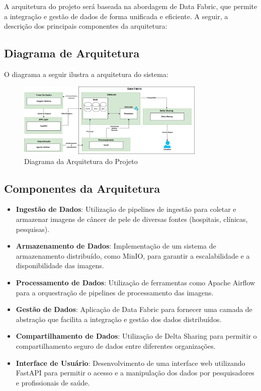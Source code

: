 A arquitetura do projeto será baseada na abordagem de Data Fabric, que permite a integração e gestão de dados de forma unificada e eficiente. A seguir, a descrição dos principais componentes da arquitetura:

\subsection{Diagrama de Arquitetura}
O diagrama a seguir ilustra a arquitetura do sistema:
\begin{figure}[h]
    \centering
    \includegraphics[width=0.8\textwidth]{figuras/arquitetura.eps}
    \caption{Diagrama da Arquitetura do Projeto }
    \label{fig:arquitetura_projeto}
\end{figure} 



\subsection{Componentes da Arquitetura}
\begin{itemize}
    \item \textbf{Ingestão de Dados}: Utilização de pipelines de ingestão para coletar e armazenar imagens de câncer de pele de diversas fontes (hospitais, clínicas, pesquisas).
    \item \textbf{Armazenamento de Dados}: Implementação de um sistema de armazenamento distribuído, como MinIO, para garantir a escalabilidade e a disponibilidade das imagens.
    \item \textbf{Processamento de Dados}: Utilização de ferramentas como Apache Airflow para a orquestração de pipelines de processamento das imagens.
    \item \textbf{Gestão de Dados}: Aplicação de Data Fabric para fornecer uma camada de abstração que facilita a integração e gestão dos dados distribuídos.
    \item \textbf{Compartilhamento de Dados}: Utilização de Delta Sharing para permitir o compartilhamento seguro de dados entre diferentes organizações.
    \item \textbf{Interface de Usuário}: Desenvolvimento de uma interface web utilizando FastAPI para permitir o acesso e a manipulação dos dados por pesquisadores e profissionais de saúde.
\end{itemize}

